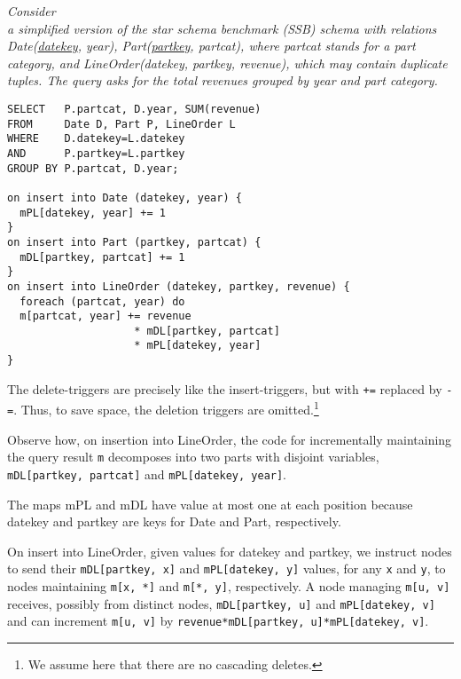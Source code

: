 \begin{example}\em
\label{ex:ssb}
Con\-sider \\ a simplified version of the star schema
benchmark (SSB) schema with relations Date(\underline{datekey}, year),
Part(\underline{partkey}, partcat), where partcat stands for a part category,
and LineOrder(datekey, partkey, revenue), which may contain duplicate tuples.
The query asks for the total revenues grouped by year and part category.

\begin{verbatim}
SELECT   P.partcat, D.year, SUM(revenue)
FROM     Date D, Part P, LineOrder L
WHERE    D.datekey=L.datekey
AND      P.partkey=L.partkey
GROUP BY P.partcat, D.year;

on insert into Date (datekey, year) {
  mPL[datekey, year] += 1
}
on insert into Part (partkey, partcat) {
  mDL[partkey, partcat] += 1
}
on insert into LineOrder (datekey, partkey, revenue) {
  foreach (partcat, year) do
  m[partcat, year] += revenue
                    * mDL[partkey, partcat]
                    * mPL[datekey, year]
}
\end{verbatim}
The delete-triggers are precisely
like the insert-triggers, but with {\tt +=} replaced by {\tt -=}.
Thus, to save space, the deletion triggers are omitted.\footnote{We assume
here that there are no cascading deletes.}

Observe how, on insertion into LineOrder, the code for incrementally
maintaining the query result {\tt m} decomposes into
two parts with disjoint variables, 
{\tt mDL[partkey, partcat]} and {\tt mPL[datekey, year]}.

The maps mPL and mDL have value at most
one at each position because datekey and partkey are keys for Date and Part,
respectively.

On insert into LineOrder, given values for
datekey and partkey, we instruct nodes
to send their {\tt mDL[partkey, x]} and {\tt mPL[datekey, y]} values,
for any {\tt x} and {\tt y},
to nodes maintaining {\tt m[x, *]} and {\tt m[*, y]}, respectively.
A node managing {\tt m[u, v]} receives, possibly from distinct nodes,
{\tt mDL[partkey, u]} and {\tt mPL[datekey, v]}
and can increment {\tt m[u, v]} by
{\tt revenue*mDL[partkey, u]*mPL[datekey, v]}.
%
\punto
\end{example}


